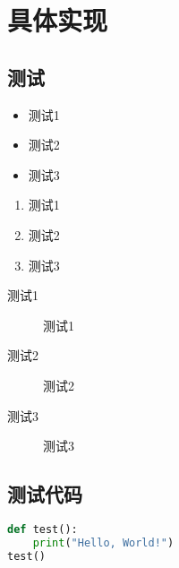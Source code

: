 \chapter{具体实现}

\section{测试}
\begin{itemize}
    \item 测试1
    \item 测试2
    \item 测试3
\end{itemize}

\begin{enumerate}
    \item 测试1
    \item 测试2
    \item 测试3
\end{enumerate}

\begin{description}
    \item[测试1] 测试1
    \item[测试2] 测试2
    \item[测试3] 测试3
\end{description}

\section{测试代码}

\begin{lstlisting}[language=python]
def test():
    print("Hello, World!")
test()
\end{lstlisting}